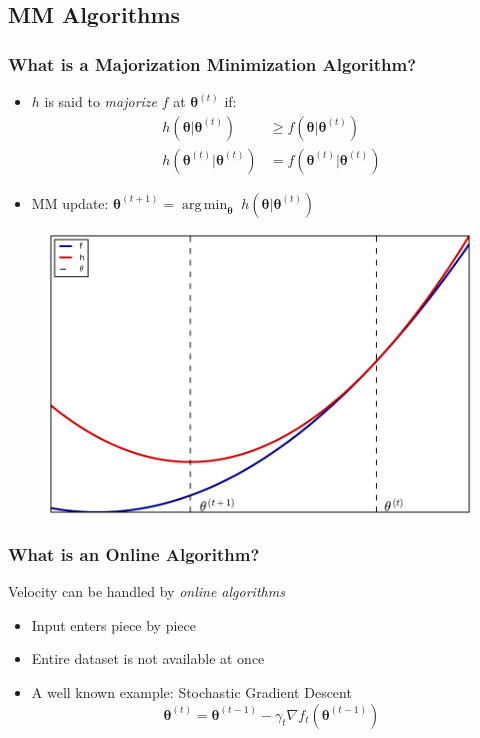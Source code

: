 \documentclass{beamer}
\newcommand{\iter}[2]{#1^{(#2)}}
\DeclareMathOperator*{\argmin}{arg\,min}
\begin{document}
\subsection{MM Algorithms}
\begin{frame}
  \frametitle{What is a Majorization Minimization Algorithm?}
  \begin{itemize}
    \item $h$ is said to \emph{majorize}  $f$ at $\iter{\bm\theta}{t}$ if:
    $$\begin{aligned}
      h(\bm\theta|\iter{\bm\theta}{t}) &\ge f(\bm\theta|\iter{\bm\theta}{t}) \\
      h(\iter{\bm\theta}{t}|\iter{\bm\theta}{t}) &= f(\iter{\bm\theta}{t}|\iter{\bm\theta}{t})
    \end{aligned}$$
    \item MM update: $\bm\theta^{(t+1)} = \argmin_{\bm\theta} \; h(\bm\theta|\bm\theta^{(t)})$
  \end{itemize}
\end{frame}
\begin{frame}
  \begin{figure}
    \includegraphics[width=\linewidth]{figures/mmvis.pdf}
  \end{figure}
\end{frame}
\begin{frame}
  \frametitle{What is an Online Algorithm?}
  Velocity can be handled by \emph{online algorithms}
  \begin{itemize}
    \item Input enters piece by piece
    \item Entire dataset is not available at once
    \item A well known example: Stochastic Gradient Descent
    $$\iter{\bm\theta}{t} = \iter{\bm\theta}{t-1} - \gamma_t \nabla f_t(\iter{\bm\theta}{t-1})$$
  \end{itemize}
\end{frame}
\end{document}
